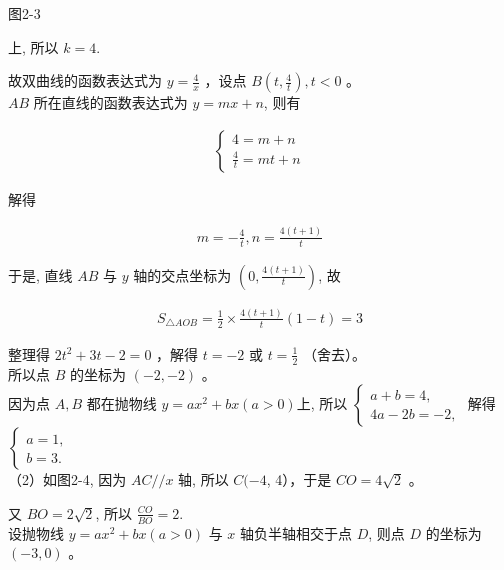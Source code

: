 \documentclass[10pt]{article}
\begin{document}
图2-3

上, 所以 $k=4$.

故双曲线的函数表达式为 $y=\frac{4}{x}$ ，设点 $B\left(t, \frac{4}{t}\right), t<0$ 。\\
$A B$ 所在直线的函数表达式为 $y=m x+n$, 则有

\begin{align*}
\left\{\begin{array}{l}
4=m+n \\
\frac{4}{t}=m t+n
\end{array}\right.
\end{align*}

解得

\begin{align*}
m=-\frac{4}{t}, n=\frac{4(t+1)}{t}
\end{align*}

于是, 直线 $A B$ 与 $y$ 轴的交点坐标为 $\left(0, \frac{4(t+1)}{t}\right)$, 故

\begin{align*}
S_{\triangle A O B}=\frac{1}{2} \times \frac{4(t+1)}{t}(1-t)=3
\end{align*}

整理得 $2 t^{2}+3 t-2=0$ ，解得 $t=-2$ 或 $t=\frac{1}{2}$ （舍去）。\\
所以点 $B$ 的坐标为 $(-2,-2)$ 。\\
因为点 $A, B$ 都在抛物线 $y=a x^{2}+b x(a>0)$上, 所以 $\left\{\begin{array}{l}a+b=4, \\ 4 a-2 b=-2,\end{array}\right.$ 解得 $\left\{\begin{array}{l}a=1, \\ b=3 .\end{array}\right.$\\
（2）如图2-4, 因为 $A C / / x$ 轴, 所以 $C(-4$, 4），于是 $C O=4 \sqrt{2}$ 。

又 $B O=2 \sqrt{2}$, 所以 $\frac{C O}{B O}=2$.\\
设抛物线 $y=a x^{2}+b x(a>0)$ 与 $x$ 轴负半轴相交于点 $D$, 则点 $D$ 的坐标为 $(-3,0)$ 。
\end{document}
